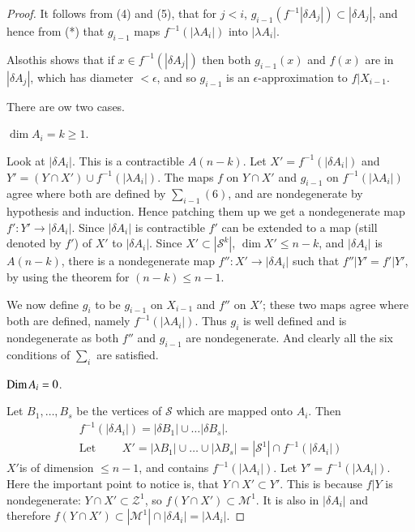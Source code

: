 \begin{proof}
It follows from (4) and (5), that for $j<i$, $g_{i-1}(f^{-1}|\delta A_{j}|)\subset |\delta A_{j}|$, and hence from (*) that $g_{i-1}$ maps $f^{-1}(|\lambda A_{i}|)$ into $|\lambda A_{i}|$.

Also\pageoriginale this shows that if $x\in f^{-1}(|\delta A_{j}|)$ then both $g_{i-1}(x)$ and $f(x)$ are in $|\delta A_{j}|$, which has diameter $<\epsilon$, and so $g_{i-1}$ is an $\epsilon$-approximation to $f|X_{i-1}$.

There are ow two cases.
\begin{case}
$\dim A_{i}=k\geq 1$.
\end{case}

Look at $|\delta A_{i}|$. This is a contractible $A(n-k)$. Let $X'=f^{-1}(|\delta A_{i}|)$ and $Y'=(Y\cap X')\cup f^{-1}(|\lambda A_{i}|)$. The maps $f$ on $Y\cap X'$ and $g_{i-1}$ on $f^{-1}(|\lambda A_{i}|)$ agree where both are defined by $\sum_{i-1}(6)$, and are nondegenerate by hypothesis and induction. Hence patching them up we get a nondegenerate map $f':Y'\to |\delta A_{i}|$. Since $|\delta A_{i}|$ is contractible $f'$ can be extended to a map (still denoted by $f'$) of $X'$ to $|\delta A_{i}|$. Since $X'\subset |\mathscr{S}^{k}|$, $\dim X'\leq n-k$, and $|\delta A_{i}|$ is $A(n-k)$, there is a nondegenerate map $f'':X'\to |\delta A_{i}|$ such that $f''|Y'=f'|Y'$, by using the theorem for $(n-k)\leq n-1$. 

We now define $g_{i}$ to be $g_{i-1}$ on $X_{i-1}$ and $f''$ on $X'$; these two maps agree where both are defined, namely $f^{-1}(|\lambda A_{i}|)$. Thus $g_{i}$ is well defined and is nondegenerate as both $f''$ and $g_{i-1}$ are nondegenerate. And clearly all the six conditions of $\sum_{i}$ are satisfied.
\begin{case}%
$\operatorname{Dim} A_{i}=0$.
\end{case}

Let $B_{1},\ldots,B_{s}$ be the vertices of $\mathscr{S}$ which are mapped onto $A_{i}$. Then
\begin{gather*}
f^{-1}(|\delta A_{i}|)=|\delta B_{1}|\cup\ldots |\delta B_{s}|.\\
\text{Let } \qquad X'=|\lambda B_{1}|\cup\ldots \cup |\lambda B_{s}|=|\mathscr{S}^1|\cap f^{-1}(|\delta A_{i}|)
\end{gather*}
$X'$\pageoriginale is of dimension $\leq n-1$, and contains $f^{-1}(|\lambda A_{i}|)$. Let $Y'=f^{-1}(|\lambda A_{i}|)$. Here the important point to notice is, that $Y\cap X'\subset Y'$. This is because $f|Y$ is nondegenerate: $Y\cap X'\subset \mathscr{Z}^{1}$, so $f(Y\cap X')\subset \mathscr{M}^{1}$. It is also in $|\delta A_{i}|$ and therefore $f(Y\cap X')\subset |\mathscr{M}^{1}|\cap |\delta A_{i}|=|\lambda A_{i}|$. 


\end{proof}
